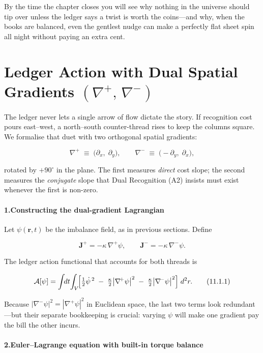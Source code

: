 \documentclass[11pt,oneside]{book}
\begin{document}
By the time the chapter closes you will see why nothing in the universe should tip over unless the ledger says a twist is worth the coins—and why, when the books are balanced, even the gentlest nudge can make a perfectly flat sheet spin all night without paying an extra cent.

\section{Ledger Action with Dual Spatial Gradients \texorpdfstring{$(\nabla^{\!+},\,\nabla^{\!-})$}{(∇⁺, ∇⁻)}}
\label{sec:dual-gradients}

The ledger never lets a single arrow of flow dictate the story.  
If recognition cost pours east–west, a north–south counter-thread rises to keep the columns square.  
We formalise that duet with two orthogonal spatial gradients:

\[
  \nabla^{\!+} \;\equiv\; \bigl(\partial_x,\; \partial_y\bigr),
  \qquad
  \nabla^{\!-} \;\equiv\; \bigl(-\partial_y,\; \partial_x\bigr),
\]

rotated by $+90^{\circ}$ in the plane.  
The first measures \emph{direct} cost slope; the second measures the
\emph{conjugate} slope that Dual Recognition (A2) insists must exist
whenever the first is non-zero.

\paragraph*{1.\;Constructing the dual-gradient Lagrangian}

Let $\psi(\mathbf r,t)$ be the imbalance field, as in previous sections.
Define

\[
  \mathbf J^{\!+} = -\kappa\,\nabla^{\!+}\psi,
  \qquad
  \mathbf J^{\!-} = -\kappa\,\nabla^{\!-}\psi.
\]

The ledger action functional that accounts for both threads is

\[
  \mathcal A[\psi] = 
  \int\!\!dt\!\int_V\!
  \Bigl[
      \tfrac12 \dot\psi^{\,2}
      \;-\;
      \tfrac{\kappa}{2}\bigl|\nabla^{\!+}\psi\bigr|^{2}
      \;-\;
      \tfrac{\kappa}{2}\bigl|\nabla^{\!-}\psi\bigr|^{2}
      \Bigr]\;d^{2}r.
  \tag{11.1.1}\label{eq:dual-action}
\]

Because $|\nabla^{\!-}\psi|^{2}=|\nabla^{\!+}\psi|^{2}$ in Euclidean
space, the last two terms look redundant—but their separate bookkeeping
is crucial: varying $\psi$ will make one gradient pay the bill the other
incurs.

\paragraph*{2.\;Euler–Lagrange equation with built-in torque balance}
\end{document}
